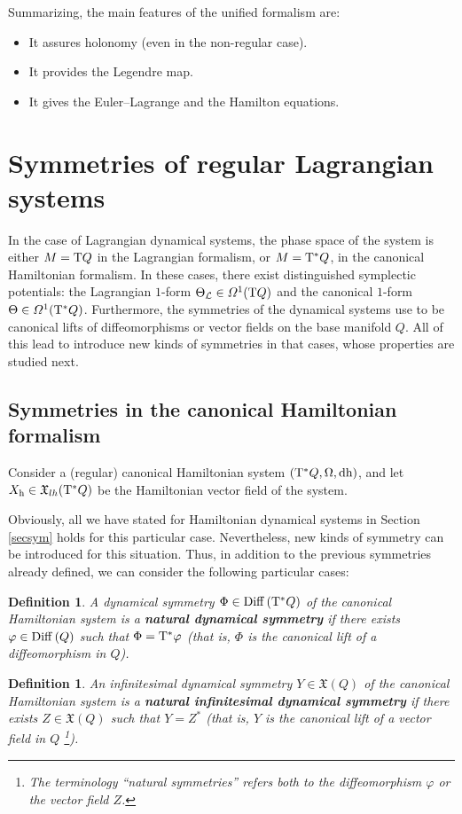 \documentclass[12pt]{report}
\newtheorem{definition}[teor]{Definition}
\def\bit{\begin{itemize}}
\def\eit{\end{itemize}}
\def\vf{\mathfrak X}
\def\df{{\mit\Omega}}
\def\Lag{{\cal L}}
\def\d{{\rm d}}
\def\Tan{{\rm T}}
\begin{document}
Summarizing, the main features of the unified formalism are:
\bit
\item
It assures holonomy (even in the non-regular case).
\item
It provides the Legendre map.
\item
It gives the Euler--Lagrange and the Hamilton equations.
\eit


\section{Symmetries of regular Lagrangian systems}


In the case of Lagrangian dynamical systems,
the phase space of the system is either
$M=\Tan Q$ in the Lagrangian formalism, or $M=\Tan^* Q$,
in the canonical Hamiltonian formalism.
In these cases, there exist distinguished symplectic potentials:
the Lagrangian $1$-form $\Theta_\Lag\in\df^1(\Tan Q)$ and the
canonical $1$-form $\Theta\in\df^1(\Tan^*Q)$.
Furthermore, the symmetries of the
dynamical systems use to be canonical lifts
of diffeomorphisms or vector fields on the base manifold $Q$.
All of this lead to introduce new kinds of symmetries in that cases,
whose properties are studied next.


\subsection{Symmetries in the canonical Hamiltonian formalism}


Consider a (regular) canonical Hamiltonian system $(\Tan^*Q,\Omega,\d{\rm h})$,
and let $X_{\rm h}\in\vf_{lh}(\Tan^*Q)$ be the Hamiltonian vector field of the system.

Obviously, all we have stated for Hamiltonian dynamical systems
in Section \ref{secsym} holds for this particular case.
Nevertheless, new kinds of symmetry can be introduced for this situation.
Thus, in addition to the previous symmetries already defined,
we can consider the following particular cases:

\begin{definition}
A dynamical symmetry $\Phi\in {\rm Diff}\, (\Tan^*Q)$ of the canonical Hamiltonian system
is a \textbf{natural dynamical symmetry} if there exists $\varphi\in{\rm Diff}\, (Q)$ 
such that $\Phi=\Tan^*\varphi$ (that is,  $\Phi$ is the canonical lift
of a diffeomorphism in $Q$).
 \end{definition}

\begin{definition}
An infinitesimal dynamical symmetry $Y\in\vf (Q)$ of the canonical Hamiltonian system
is a \textbf{natural infinitesimal dynamical symmetry} if there exists $Z\in\vf (Q)$ 
such that $Y=Z^*$ (that is, $Y$ is the canonical lift of a vector field in $Q$
\footnote{
The terminology ``natural symmetries'' refers both to the diffeomorphism $\varphi$
or the vector field $Z$.}).
\label{gsdef2}
 \end{definition}
\end{document}
